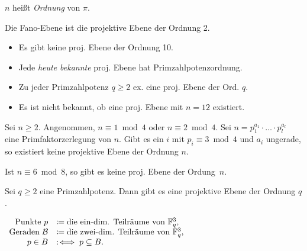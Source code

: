 \documentclass{cheat-sheet}
\newcommand{\F}{\mathbb{F}} %
\newcommand{\Blocks}{\mathcal{B}} %
\begin{document}
\begin{defn}
  $n$ heißt \emph{Ordnung} von $\pi$.
\end{defn}

\begin{bsp}
  Die Fano-Ebene ist die projektive Ebene der Ordnung 2.
\end{bsp}



\begin{fakten}
  \begin{itemize}
    \item Es gibt keine proj. Ebene der Ordnung 10.
    \item Jede \textit{heute bekannte} proj. Ebene hat Primzahlpotenzordnung.
    \item Zu jeder Primzahlpotenz $q \geq 2$ ex. eine proj. Ebene der Ord. $q$.
    \item Es ist nicht bekannt, ob eine proj. Ebene mit $n = 12$ existiert.
  \end{itemize}
\end{fakten}

\begin{satz}
  Sei $n \geq 2$.
  Angenommen, $n \equiv 1 \bmod 4$ oder $n \equiv 2 \bmod 4$.
  Sei $n = p_1^{a_1} \cdot \ldots \cdot p_l^{a_l}$ eine Primfaktorzerlegung von $n$.
  Gibt es ein $i$ mit $p_i \equiv 3 \bmod 4$ und $a_i$ ungerade, so existiert keine projektive Ebene der Ordnung $n$.
\end{satz}

\begin{kor}
  Ist $n \equiv 6 \bmod 8$, so gibt es keine proj. Ebene der Ordung~$n$.
\end{kor}

\begin{satz}
  Sei $q \geq 2$ eine Primzahlpotenz.
  Dann gibt es eine projektive Ebene der Ordnung $q$.
\end{satz}

\begin{konstr}
  $\begin{array}[t]{r l}
    \text{Punkte } p & \coloneqq \text{die ein-dim. Teilräume von $\F_q^3$,} \\
    \text{Geraden } \Blocks & \coloneqq \text{die zwei-dim. Teilräume von $\F_q^3$,} \\
    p \in B & \!\!\!\coloniff p \subseteq B.
  \end{array}$
\end{konstr}
\end{document}
